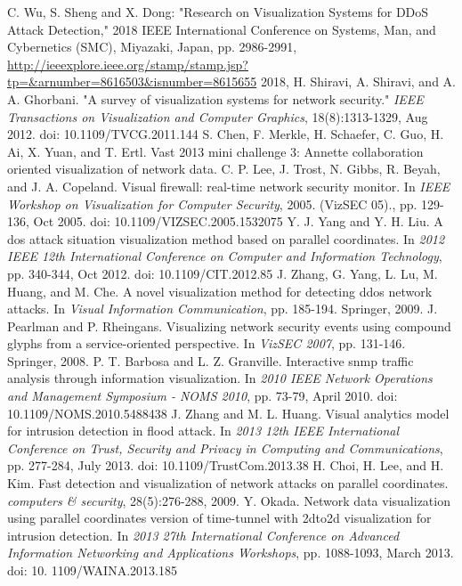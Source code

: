 \begin{thebibliography}{99}
 C. Wu, S. Sheng and X. Dong: "Research on Visualization Systems for DDoS Attack Detection," 2018 IEEE International Conference on Systems, Man, and Cybernetics (SMC), Miyazaki, Japan, pp. 2986-2991, \url{http://ieeexplore.ieee.org/stamp/stamp.jsp?tp=&arnumber=8616503&isnumber=8615655} 2018, 
 H. Shiravi, A. Shiravi, and A. A. Ghorbani. "A survey of visualization systems for network security." \textit{IEEE Transactions on Visualization and Computer Graphics}, 18(8):1313-1329, Aug 2012. doi: 10.1109/TVCG.2011.144
 S. Chen, F. Merkle, H. Schaefer, C. Guo, H. Ai, X. Yuan, and T. Ertl. Vast 2013 mini challenge 3: Annette collaboration oriented visualization of network data.
 C. P. Lee, J. Trost, N. Gibbs, R. Beyah, and J. A. Copeland. Visual firewall: real-time network security monitor. In \textit{IEEE Workshop on Visualization for Computer Security}, 2005. (VizSEC 05)., pp. 129-136, Oct 2005. doi: 10.1109/VIZSEC.2005.1532075
 Y. J. Yang and Y. H. Liu. A dos attack situation visualization method based on parallel coordinates. In \textit{2012 IEEE 12th International Conference on Computer and Information Technology}, pp. 340-344, Oct 2012. doi: 10.1109/CIT.2012.85
 J. Zhang, G. Yang, L. Lu, M. Huang, and M. Che. A novel visualization method for detecting ddos network attacks. In \textit{Visual Information Communication}, pp. 185-194. Springer, 2009.
 J. Pearlman and P. Rheingans. Visualizing network security events using compound glyphs from a service-oriented perspective. In \textit{VizSEC 2007}, pp. 131-146. Springer, 2008.
 P. T. Barbosa and L. Z. Granville. Interactive snmp traffic analysis through information visualization. In \textit{2010 IEEE Network Operations and Management Symposium - NOMS 2010}, pp. 73-79, April 2010. doi: 10.1109/NOMS.2010.5488438
 J. Zhang and M. L. Huang. Visual analytics model for intrusion detection in flood attack. In \textit{2013 12th IEEE International Conference on Trust, Security and Privacy in Computing and Communications}, pp. 277-284, July 2013. doi: 10.1109/TrustCom.2013.38
 H. Choi, H. Lee, and H. Kim. Fast detection and visualization of network attacks on parallel coordinates. \textit{computers \& security}, 28(5):276-288, 2009.
 Y. Okada. Network data visualization using parallel coordinates version of time-tunnel with 2dto2d visualization for intrusion detection. In \textit{2013 27th International Conference on Advanced Information Networking and Applications Workshops}, pp. 1088-1093, March 2013. doi: 10. 1109/WAINA.2013.185

\end{thebibliography}
